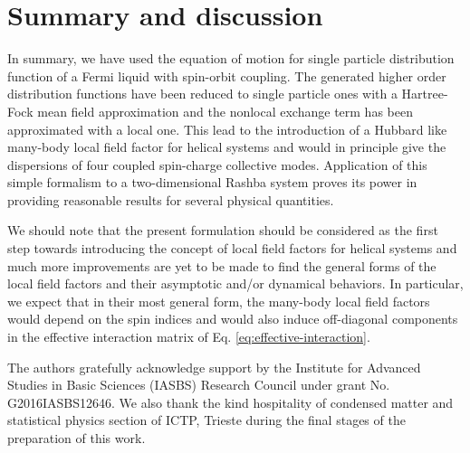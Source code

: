 \documentclass[aps, pra, reprint,superscriptaddress]{revtex4-1}
\begin{document}
 
 

\section{Summary and discussion}\label{sect:summary}

In summary, we have used the equation of motion for single particle distribution function of a Fermi liquid with spin-orbit coupling. The generated higher order distribution functions have been reduced to single particle ones with a Hartree-Fock mean field approximation and the nonlocal exchange term has been approximated with a local one. This lead to the introduction of a Hubbard like many-body local field factor for helical systems and would in principle give the dispersions of four coupled spin-charge collective modes. Application of this simple formalism to a two-dimensional Rashba system proves its power in providing reasonable results for several physical quantities.

We should note that the present formulation should be considered as the first step towards introducing the concept of local field factors for helical systems and much more improvements are yet to be made to find the general forms of the local field factors and their asymptotic and/or dynamical behaviors. In particular, we expect that in their most general form, the many-body local field factors would depend on the spin indices and would also induce off-diagonal components in the effective interaction matrix of Eq. \eqref{eq:effective-interaction}.


\acknowledgments
The authors gratefully acknowledge support by the Institute for Advanced Studies in Basic Sciences (IASBS) Research Council under grant No. G2016IASBS12646.
We also thank the kind hospitality of condensed matter and statistical physics section of ICTP, Trieste during the final stages of the preparation of this work.


\appendix
\end{document}
